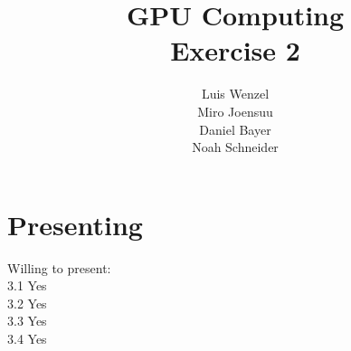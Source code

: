 \documentclass[12pt,twoside,a4paper]{article}
\title{GPU Computing\\
Exercise 2}
\author{
  Luis Wenzel\\
  Miro Joensuu\\
  Daniel Bayer\\
  Noah Schneider
}
\date{}
\begin{document}
\maketitle

\section{Presenting}
Willing to present:\\
3.1 Yes\\
3.2 Yes\\
3.3 Yes\\
3.4 Yes \\


	




\FloatBarrier
\end{document}
